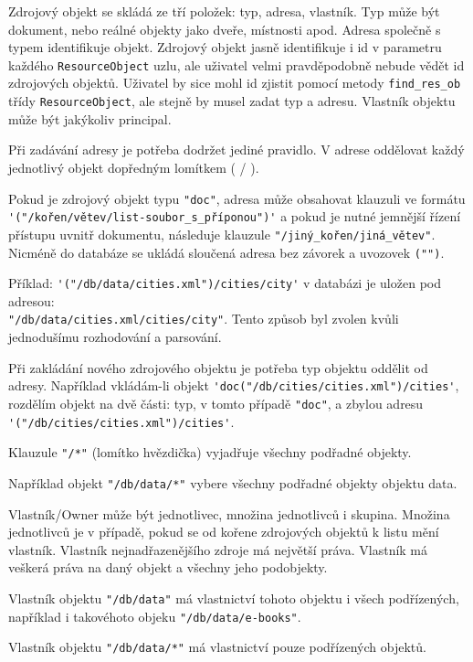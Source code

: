 Zdrojový objekt se skládá ze tří položek: typ, adresa, vlastník. Typ může být dokument, nebo reálné objekty jako dveře, místnosti apod. Adresa společně s typem identifikuje objekt. Zdrojový objekt jasně identifikuje i id v parametru každého \verb|ResourceObject| uzlu, ale uživatel velmi pravděpodobně nebude vědět id zdrojových objektů. Uživatel by sice mohl id zjistit pomocí metody \verb|find_res_ob| třídy \verb|ResourceObject|, ale stejně by musel zadat typ a adresu. Vlastník objektu může být jakýkoliv principal.

Při zadávání adresy je potřeba dodržet jediné pravidlo. V adrese oddělovat každý jednotlivý objekt dopředným lomítkem ( / ).

Pokud je zdrojový objekt typu \verb|"doc"|, adresa může obsahovat klauzuli ve formátu \\ \verb|'("/kořen/větev/list-soubor_s_příponou")'| a pokud je nutné jemnější řízení přístupu uvnitř dokumentu, následuje klauzule \verb|"/jiný_kořen/jiná_větev"|. Nicméně do databáze se ukládá sloučená adresa bez závorek a uvozovek \verb|("")|.

\noindent Příklad: \verb|'("/db/data/cities.xml")/cities/city'| v databázi je uložen pod adresou: \\ \verb|"/db/data/cities.xml/cities/city"|.
Tento způsob byl zvolen kvůli jednodušímu rozhodování a parsování.

Při zakládání nového zdrojového objektu je potřeba typ objektu oddělit od adresy. Například vkládám-li objekt \verb|'doc("/db/cities/cities.xml")/cities'|, rozdělím objekt na dvě části: typ, v tomto případě \verb|"doc"|, a zbylou adresu 
\verb|'("/db/cities/cities.xml")/cities'|.

\noindent Klauzule \verb|"/*"| (lomítko hvězdička) vyjadřuje všechny podřadné objekty. 

\noindent Například objekt \verb|"/db/data/*"| vybere všechny podřadné objekty objektu data.

Vlastník/Owner může být jednotlivec, množina jednotlivců i skupina.
Množina jednotlivců je v případě, pokud se od kořene zdrojových objektů k listu mění vlastník. Vlastník nejnadřazenějšího zdroje má největší práva. Vlastník má veškerá práva na daný objekt a všechny jeho podobjekty. 

\noindent Vlastník objektu  \verb|"/db/data"| má vlastnictví tohoto objektu i všech podřízených, například i takovéhoto objeku \verb|"/db/data/e-books"|.

\noindent Vlastník objektu  \verb|"/db/data/*"| má vlastnictví pouze podřízených objektů.

